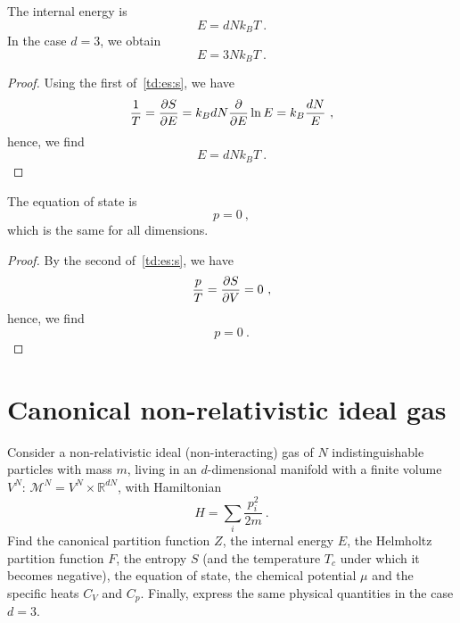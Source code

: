     The internal energy is 
    \begin{equation*}
        E = d N k_B T ~.
    \end{equation*}
    In the case $d = 3$, we obtain 
    \begin{equation*}
        E = 3 N k_B T ~.
    \end{equation*}
    \begin{proof}
        Using the first of~\eqref{td:es:s}, we have
        \begin{equation*}
            \frac{1}{T} = \frac{\partial S}{\partial E} = k_B dN \frac{\partial}{\partial E} \ln E = k_B \frac{dN}{E} ~,
        \end{equation*}
        hence, we find
        \begin{equation*}
            E = d N k_B T ~.
        \end{equation*}
    \end{proof}
    The equation of state is  
    \begin{equation*}
        p = 0 ~,
    \end{equation*}
    which is the same for all dimensions.
    \begin{proof}
        By the second of~\eqref{td:es:s}, we have
        \begin{equation*}
            \frac{p}{T} = \frac{\partial S}{\partial V} = 0 ~,
        \end{equation*}
        hence, we find
        \begin{equation*}
            p = 0 ~.
        \end{equation*}
    \end{proof}

\section{Canonical non-relativistic ideal gas}

    \begin{exercise}
        Consider a non-relativistic ideal (non-interacting) gas of $N$ indistinguishable particles with mass $m$, living in an $d$-dimensional manifold with a finite volume $V^N$: $\mathcal M^N = V^N \times \mathbb R^{dN}$, with Hamiltonian 
        \begin{equation*}
            H = \sum_i \frac{p^2_i}{2m} ~.
        \end{equation*}
        Find the canonical partition function $Z$, the internal energy $E$, the Helmholtz partition function $F$, the entropy $S$ (and the temperature $T_c$ under which it becomes negative), the equation of state, the chemical potential $\mu$ and the specific heats $C_V$ and $C_p$. Finally, express the same physical quantities in the case $d = 3$.
    \end{exercise}

